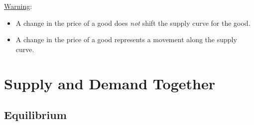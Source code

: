 	\underline{Warning}:
	
	\begin{itemize}
	
	\item A change in the price of a good does \textit{not} shift the supply curve for the good.
	
	\item A change in the price of a good represents a movement along the supply curve.
	
	\end{itemize}
	
\section{Supply and Demand Together}

\subsection{Equilibrium}

